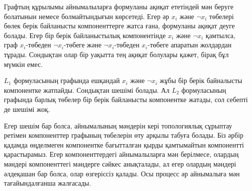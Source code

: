 Графтың құрылымы айнымалыларға формуланы ақиқат ететіндей
мән беруге болатынын немесе болмайтындығын көрсетеді.
Егер әр $x_i$ және $\lnot x_i$ 
төбелері бөлек берік байланысты
компоненттерге жатса ғана, формуланы ақиқат деуге болады.
Егер бір берік байланыстылық компонентінде $x_i$ және $\lnot x_i$ қамтылса, граф $x_i$-төбеден $\lnot x_i$-төбеге 
және $\lnot x_i$-төбеден $x_i$-төбеге апаратын жолдардан тұрады. Сондықтан олар бір уақытта тең ақиқат
болулары қажет, бірақ бұл мүмкін емес.

$L_1$ формуласының графында ешқандай $x_i$ және $\lnot x_i$ жұбы бір
берік байналысты компонентке жатпайды. Сондықтан шешімі болады.
Ал $L_2$ формуласының графында барлық төбелер бір берік байланысты
компонентке жатады, сол себепті де шешімі жоқ.


Егер шешім бар болса, айнымалының мәндерін кері топологиялық сұрыптау ретімен компоненттер графының төбелерін өту арқылы табуға болады. Біз әрбір қадамда өңделмеген компонентке бағытталған қырды қамтымайтын компонентті қарастырамыз. Егер компоненттердегі айнымалыларға мән 
берілмесе, олардың мәндері компоненттегі мәндерге 
сәйкес анықталады, ал егер олардың мәндері әлдеқашан бар болса,
олар өзгеріссіз қалады. Осы процесс әр айнымалыға мән тағайындалғанша жалғасады.

